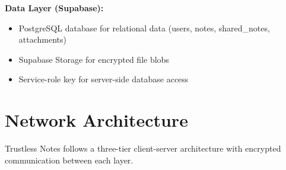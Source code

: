 \textbf{Data Layer (Supabase):}
\begin{itemize}
    \item PostgreSQL database for relational data (users, notes, shared\_notes, attachments)
    \item Supabase Storage for encrypted file blobs
    \item Service-role key for server-side database access
\end{itemize}

\section{Network Architecture}

Trustless Notes follows a three-tier client-server architecture with encrypted communication between each layer.

